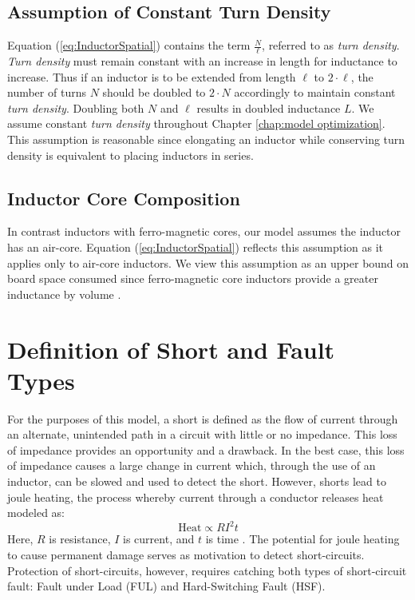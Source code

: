 \documentclass[11pt,compsoc,oneside]{report}
\begin{document}
\subsection{Assumption of Constant Turn Density} \label{ssec:Assumption of Constant}
Equation (\ref{eq:InductorSpatial}) contains the term $\frac{N}{\ell}$, referred to as \textit{turn density}. \textit{Turn density} must remain constant with an increase in length for inductance to increase. Thus if an inductor is to be extended from length $\ell$ to $2\cdot \ell$, the number of turns $N$ should be doubled to $2\cdot N$ accordingly to maintain constant \textit{turn density}. Doubling both $N$ and $\ell$ results in doubled inductance $L$. We assume constant \textit{turn density} throughout Chapter \ref{chap:model optimization}. This assumption is reasonable since elongating an inductor while conserving turn density is equivalent to placing inductors in series.
\subsection{Inductor Core Composition}
In contrast inductors with ferro-magnetic cores, our model assumes the inductor has an air-core. Equation (\ref{eq:InductorSpatial}) reflects this assumption as it applies only to air-core inductors. We view this assumption as an upper bound on board space consumed since ferro-magnetic core inductors provide a greater inductance by volume \cite{NiFe}.

\section{Definition of Short and Fault Types}
For the purposes of this model, a short is defined as the flow of current through an alternate, unintended path in a circuit with little or no impedance. This loss of impedance provides an opportunity and a drawback. In the best case, this loss of impedance causes a large change in current which, through the use of an inductor, can be slowed and used to detect the short. However, shorts lead to joule heating, the process whereby current through a conductor releases heat modeled as:
\begin{equation}\label{eq:JouleHeating}
\text{Heat} \propto R I^{2} t
\end{equation}
Here, $R$ is resistance, $I$ is current, and $t$ is time \cite{uniphy}. The potential for joule heating to cause permanent damage serves as motivation to detect short-circuits. Protection of short-circuits, however, requires catching both types of short-circuit fault: Fault under Load (FUL) and Hard-Switching Fault (HSF).
\end{document}
